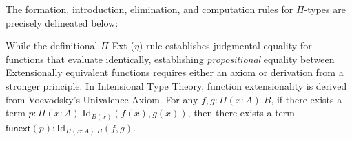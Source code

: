 \begin{definition}
The formation, introduction, elimination, and computation rules for $\Pi$-types are precisely delineated below:

\begin{mathpar}




\end{mathpar}
\end{definition}

\begin{lemma}
\label{lem:funext}
While the definitional $\Pi$-Ext ($\eta$) rule establishes judgmental equality for functions that evaluate identically, establishing \emph{propositional} equality between Extensionally equivalent functions requires either an axiom or derivation from a stronger principle. In Intensional Type Theory, function extensionality is derived from Voevodsky's Univalence Axiom. For any $f, g : \Pi(x:A).B$, if there exists a term $p : \Pi(x:A).\mathrm{Id}_{B(x)}(f(x), g(x))$, then there exists a term $\mathsf{funext}(p) : \mathrm{Id}_{\Pi(x:A).B}(f, g)$.
\end{lemma}

